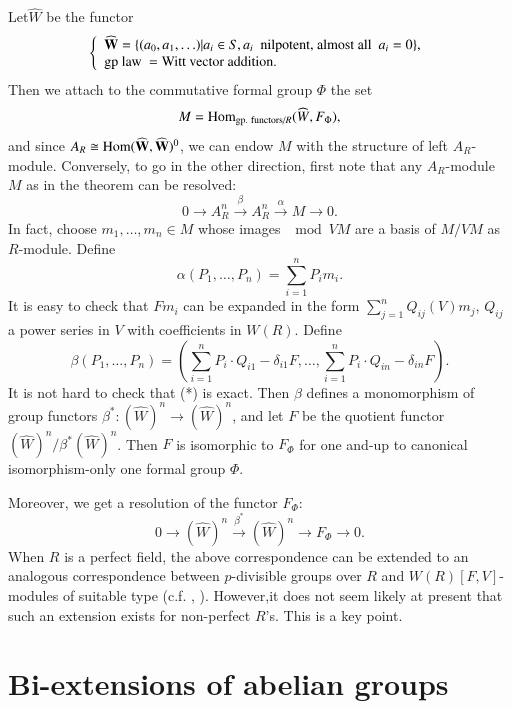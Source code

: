 Let\pageoriginale $\widehat{W}$ be the functor
$$
\left\{
\begin{array}{l}
\widehat{\mathbf{W}}=\{(a_{0},a_{1},\ldots)|a_{i}\in S, a_{i}\text{~ nilpotent, almost all~ } a_{i}=0\},\\
\text{gp law } = \text{Witt vector addition.}
\end{array}\right.
$$
Then we attach to the commutative formal group $\Phi$ the set
$$
M=\operatorname{\mathrm{Hom}}_{\text{gp. functors/}R}(\widehat{W},F_{\Phi}),
$$
and since $A_{R}\cong \operatorname{\mathrm{Hom}} (\widehat{\mathbf{W}},\widehat{\mathbf{W}})^{0}$, we can endow $M$ with the structure of left $A_{R}$-module. Conversely, to go in the other direction, first note that any $A_{R}$-module $M$ as in the theorem can be resolved:
\begin{equation*}
0\to A^{n}_{R}\xrightarrow{\beta}A^{n}_{R}\xrightarrow{\alpha}M\to 0.\tag{*}
\end{equation*}
In fact, choose $m_{1},\ldots,m_{n}\in M$ whose images $\mod VM$ are a basis of $M/VM$ as $R$-module. Define
$$
\alpha(P_{1},\ldots,P_{n})=\sum\limits^{n}_{i=1}P_{i}m_{i}.
$$
It is easy to check that $Fm_{i}$ can be expanded in the form $\sum\limits^{n}_{j=1}Q_{ij}(V)m_{j}$, $Q_{ij}$ a power series in $V$ with coefficients in $W(R)$. Define
$$
\beta(P_{1},\ldots,P_{n})=\left(\sum\limits^{n}_{i=1}P_{i}\cdot Q_{i1}-\delta_{i1}F,\ldots,\sum\limits^{n}_{i=1}P_{i}\cdot Q_{in}-\delta_{in}F\right).
$$
It is not hard to check that (*) is exact. Then $\beta$ defines a monomorphism of group functors $\beta^{*}:(\widehat{W})^{n}\to (\widehat{W})^{n}$, and let $F$ be the quotient functor $(\widehat{W})^{n}/\beta^{*}(\widehat{W})^{n}$. Then $F$ is isomorphic to $F_{\Phi}$ for one and-up to canonical isomorphism-only one formal group $\Phi$.

Moreover, we get a resolution of the functor $F_{\Phi}$:
$$
0\to (\widehat{W})^{n}\xrightarrow{\beta^{*}}(\widehat{W})^{n}\to F_{\Phi}\to 0.
$$
When $R$ is a perfect field, the above correspondence can be extended to an analogous correspondence between $p$-divisible groups over $R$ and $W(R)[F,V]$-modules of suitable type (c.f. \cite{art15-key4}, \cite{art15-key5}). However,\pageoriginale it does not seem likely at present that such an extension exists for non-perfect $R$'s. This is a key point.

\section{Bi-extensions of abelian groups}\label{art15-sec2}

